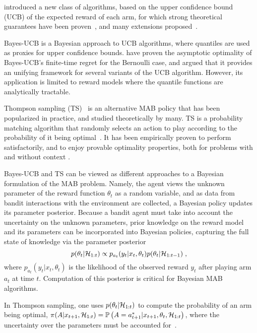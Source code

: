\citet{j-Lai1985} introduced a new class of algorithms,
based on the upper confidence bound (UCB) of the expected reward of each arm,
for which strong theoretical guarantees have been proven~\citep{j-Lai1987},
and many extensions proposed~\citep{ip-Garivier2011,ip-Garivier2011a}.

Bayes-UCB \citep{ip-Kaufmann2012} is a Bayesian approach to UCB algorithms,
where quantiles are used as proxies for upper confidence bounds.
\citet{ip-Kaufmann2012} have proven the asymptotic optimality of Bayes-UCB's finite-time regret for the Bernoulli case,
and argued that it provides an unifying framework for several variants of the UCB algorithm.
However, its application is limited to reward models where the quantile functions are analytically tractable.

Thompson sampling (TS)~\citep{j-Thompson1935} is an alternative MAB policy that has been popularized in practice, and studied theoretically by many.
TS is a probability matching algorithm that randomly selects an action to play according to the probability of it being optimal~\citep{j-Russo2018}.
It has been empirically proven to perform satisfactorily, 
and to enjoy provable optimality properties,
both for problems with and without context \citep{ip-Agrawal2012,ip-Agrawal2013,ic-Korda2013,j-Russo2014,j-Russo2016}.

Bayes-UCB and TS can be viewed as different approaches to a Bayesian formulation of the MAB problem.
Namely, the agent views the unknown parameter of the reward function $\theta_t$ as a random variable, 
and as data from bandit interactions with the environment are collected,
a Bayesian policy updates its parameter posterior.
Because a bandit agent must take into account the uncertainty on the unknown parameters,
prior knowledge on the reward model and its parameters can be incorporated into Bayesian policies,
capturing the full state of knowledge via the parameter posterior
\begin{equation}
p(\theta_t|\mathcal{H}_{1:t}) \propto p_{a_t}(y_t|x_t,\theta_t)p(\theta_t| \mathcal{H}_{1:t-1}) \; ,
\label{eq:mab_param_posterior}
\end{equation}
where $p_{a_t}(y_t | x_t, \theta_t)$ is the likelihood of the observed reward $y_t$ after playing arm $a_t$ at time $t$.
Computation of this posterior is critical for Bayesian MAB algorithms.

In Thompson sampling,
one uses $p(\theta_t|\mathcal{H}_{1:t})$ to compute the probability of an arm being optimal,
\ie $\pi(A|x_{t+1},\mathcal{H}_{1:t}) = \mathbb{P}\left( A=a_{t+1}^*|x_{t+1}, \theta_t, \mathcal{H}_{1:t} \right)$,
where the uncertainty over the parameters must be accounted for~\citep{j-Russo2018}.

